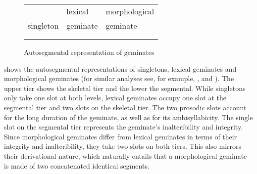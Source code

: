 \begin{figure}[h]
	\centering	
	
	\begin{tabularx}{.8\linewidth}{YYY}
		
		&		lexical			 & 		 morphological \\
		
		singleton	&			  geminate	 & 			  geminate\\		
		\\

		\begin{tikzpicture}[grow'=up]
		\Tree [.C C ] 					
		\end{tikzpicture}												&
		
		
		\begin{tikzpicture}[grow'=up]
		\Tree  [.C C C ];
		\end{tikzpicture}			
		&
		
		\begin{tikzpicture}[grow'=up]
		\Tree  [.C C ]
		\end{tikzpicture}
		\begin{tikzpicture}[grow'=up]
		\Tree  [.C C ]
		\end{tikzpicture}		
		
	\end{tabularx}
	
	\caption{Autosegmental representation of geminates}
	 \label{fig:Autosegmental representation of geminates} 

\end{figure}

 shows the autosegmental representations of singletons, lexical geminates and morphological geminates (for similar analyses see, for example,  \citealt[413]{Kenstowicz.1994}, \citealt[26 f.]{Gussmann.2002} and \citealt[62]{Ridouane.2010}). The upper tier shows the skeletal tier and the lower the segmental. While singletons only take one slot at both levels, lexical geminates occupy one slot at the segmental tier and two slots on the skeletal tier. The two prosodic slots account for the long duration of the geminate, as well as for its ambisyllabicity. The single slot on the segmental tier represents the geminate's inalteribility and integrity. Since morphological geminates differ from lexical geminates in terms of their integrity and inalteribility, they take two slots on both tiers. This also mirrors their derivational nature, which naturally entails that a morphological geminate is made of two concatenated identical segments.


